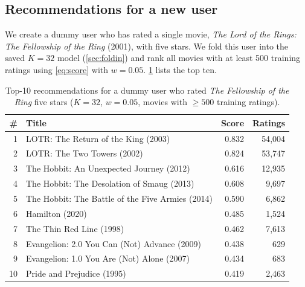 \documentclass{article}
\theoremstyle{plain}
\theoremstyle{definition}
\theoremstyle{remark}
\begin{document}
\subsection{Recommendations for a new user}
\label{sec:res-recs}

We create a dummy user who has rated a single movie, \emph{The Lord of the
Rings: The Fellowship of the Ring} (2001), with five stars. We fold this
user into the saved $K = 32$ model (\cref{sec:foldin}) and rank all movies
with at least 500 training ratings using \cref{eq:score} with $w = 0.05$.
\cref{tab:recs} lists the top ten.

\begin{table}[t]
\caption{Top-10 recommendations for a dummy user who rated \emph{The
Fellowship of the Ring} five stars ($K = 32$, $w = 0.05$, movies with
$\geq 500$ training ratings).}
\label{tab:recs}
\vskip 0.15in
\begin{center}
\begin{small}
\begin{tabular}{rlrr}
\toprule
\# & Title & Score & Ratings \\
\midrule
1  & LOTR: The Return of the King (2003)  & 0.832 & 54{,}004 \\
2  & LOTR: The Two Towers (2002)          & 0.824 & 53{,}747 \\
3  & The Hobbit: An Unexpected Journey (2012)  & 0.616 & 12{,}935 \\
4  & The Hobbit: The Desolation of Smaug (2013) & 0.608 & 9{,}697 \\
5  & The Hobbit: The Battle of the Five Armies (2014) & 0.590 & 6{,}862 \\
6  & Hamilton (2020)                       & 0.485 & 1{,}524 \\
7  & The Thin Red Line (1998)              & 0.462 & 7{,}613 \\
8  & Evangelion: 2.0 You Can (Not) Advance (2009) & 0.438 & 629 \\
9  & Evangelion: 1.0 You Are (Not) Alone (2007)   & 0.434 & 683 \\
10 & Pride and Prejudice (1995)            & 0.419 & 2{,}463 \\
\bottomrule
\end{tabular}
\end{small}
\end{center}
\vskip -0.1in
\end{table}
\end{document}
